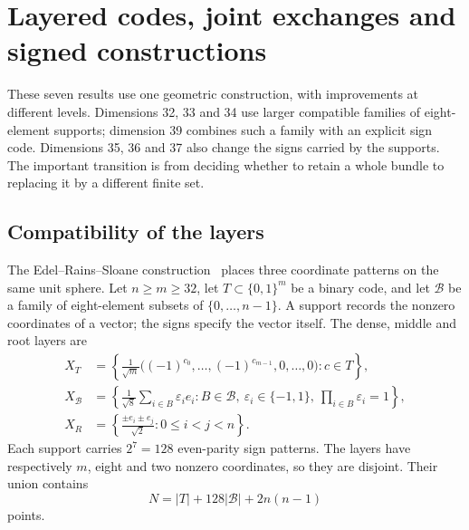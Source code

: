 \section{Layered codes, joint exchanges and signed constructions}
\label{sec:codes}

These seven results use one geometric construction, with improvements at
different levels. Dimensions 32, 33 and 34 use larger compatible families of
eight-element supports; dimension 39 combines such a family with an explicit
sign code. Dimensions 35, 36 and 37 also change the signs carried by the
supports. The important transition is from deciding whether to retain a whole
bundle to replacing it by a different finite set.

\subsection{Compatibility of the layers}

The Edel--Rains--Sloane construction~\cite{ers} places three coordinate patterns
on the same unit sphere. Let $n\ge m\ge32$, let $T\subset\{0,1\}^m$ be a
binary code, and let $\mathcal B$ be a family of eight-element subsets of
$\{0,\ldots,n-1\}$. A support records the nonzero coordinates of a vector;
the signs specify the vector itself. The dense, middle and root layers are
\begin{align*}
X_T&=\left\{\frac{1}{\sqrt m}
 \bigl((-1)^{c_0},\ldots,(-1)^{c_{m-1}},0,\ldots,0\bigr):c\in T\right\},\\
X_{\mathcal B}&=\left\{\frac{1}{\sqrt8}\sum_{i\in B}\varepsilon_i e_i:
 B\in\mathcal B,\ \varepsilon_i\in\{-1,1\},\ \prod_{i\in B}\varepsilon_i=1\right\},\\
X_R&=\left\{\frac{\pm e_i\pm e_j}{\sqrt2}:0\le i<j<n\right\}.
\end{align*}
Each support carries $2^7=128$ even-parity sign patterns. The layers have
respectively $m$, eight and two nonzero coordinates, so they are disjoint.
Their union contains
\begin{equation}
N=|T|+128|\mathcal B|+2n(n-1)
\label{eq:ers-count}
\end{equation}
points.

